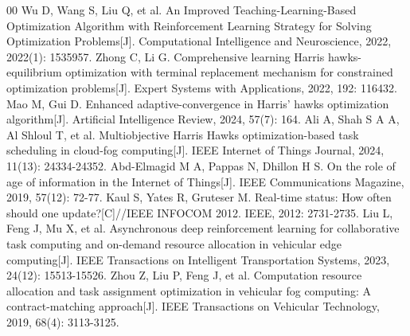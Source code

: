 \documentclass[conference]{IEEEtran}
\begin{document}
\begin{thebibliography}{00}
 Wu D, Wang S, Liu Q, et al. An Improved Teaching-Learning-Based Optimization Algorithm with Reinforcement Learning Strategy for Solving Optimization Problems[J]. Computational Intelligence and Neuroscience, 2022, 2022(1): 1535957.
 Zhong C, Li G. Comprehensive learning Harris hawks-equilibrium optimization with terminal replacement mechanism for constrained optimization problems[J]. Expert Systems with Applications, 2022, 192: 116432.
 Mao M, Gui D. Enhanced adaptive-convergence in Harris' hawks optimization algorithm[J]. Artificial Intelligence Review, 2024, 57(7): 164.
 Ali A, Shah S A A, Al Shloul T, et al. Multiobjective Harris Hawks optimization-based task scheduling in cloud-fog computing[J]. IEEE Internet of Things Journal, 2024, 11(13): 24334-24352.
 Abd-Elmagid M A, Pappas N, Dhillon H S. On the role of age of information in the Internet of Things[J]. IEEE Communications Magazine, 2019, 57(12): 72-77.
 Kaul S, Yates R, Gruteser M. Real-time status: How often should one update?[C]//IEEE INFOCOM 2012. IEEE, 2012: 2731-2735.
 Liu L, Feng J, Mu X, et al. Asynchronous deep reinforcement learning for collaborative task computing and on-demand resource allocation in vehicular edge computing[J]. IEEE Transactions on Intelligent Transportation Systems, 2023, 24(12): 15513-15526.
 Zhou Z, Liu P, Feng J, et al. Computation resource allocation and task assignment optimization in vehicular fog computing: A contract-matching approach[J]. IEEE Transactions on Vehicular Technology, 2019, 68(4): 3113-3125.
\end{thebibliography}
\end{document}

